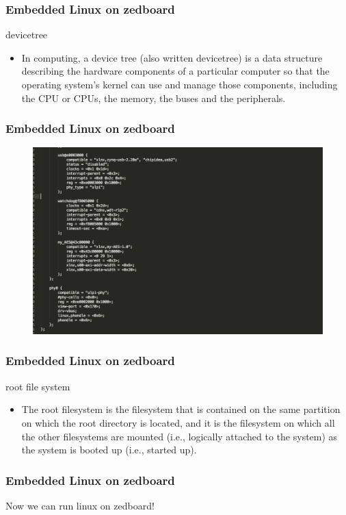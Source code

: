 \documentclass{beamer}
\begin{document}
\begin{frame}
\frametitle{Embedded Linux on zedboard}
\centering devicetree\\
\begin{itemize}
	\item In computing, a device tree (also written devicetree) is a data structure describing the hardware components of a particular computer so that the operating system's kernel can use and manage those components, including the CPU or CPUs, the memory, the buses and the peripherals.
\end{itemize}
\end{frame}

\begin{frame}[fragile]
\frametitle{Embedded Linux on zedboard}
\begin{figure}
\centering\includegraphics[scale=0.3]{devicetree.png}
\end{figure}
\end{frame}

\begin{frame}
\frametitle{Embedded Linux on zedboard}
\centering root file system
\centering \\
\begin{itemize}
	\item The root filesystem is the filesystem that is contained on the same partition on which the root directory is located, and it is the filesystem on which all the other filesystems are mounted (i.e., logically attached to the system) as the system is booted up (i.e., started up). 
\end{itemize}
\end{frame}


\begin{frame}
\frametitle{Embedded Linux on zedboard}
\centering Now we can run linux on zedboard!\\
\end{frame}
\end{document}
